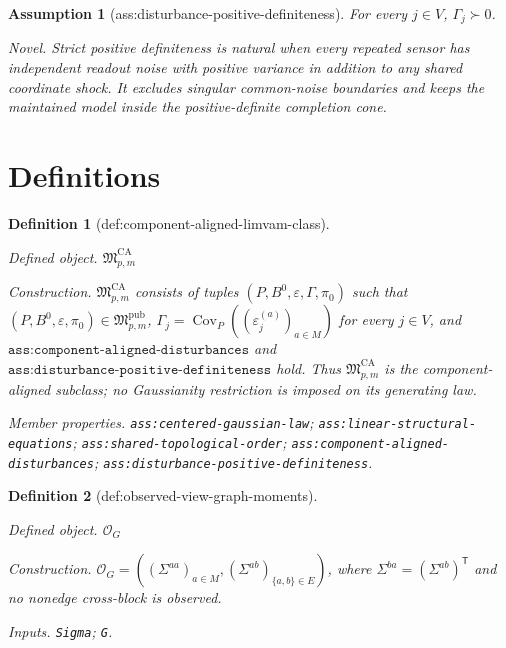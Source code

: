 \documentclass{article}
\newtheorem{assumption}{Assumption}
\newtheorem{definition}{Definition}
\begin{document}
\begin{assumption}[ass:disturbance-positive-definiteness]\label{ass:disturbance-positive-definiteness}
For every \(j\in V\), \(\Gamma_j\succ0\).
\par\smallskip\noindent\emph{Novel.} Strict positive definiteness is natural when every repeated sensor has independent readout noise with positive variance in addition to any shared coordinate shock. It excludes singular common-noise boundaries and keeps the maintained model inside the positive-definite completion cone.
\end{assumption}

\section{Definitions}

\begin{definition}[def:component-aligned-limvam-class]\label{def:component-aligned-limvam-class}
\par\smallskip\noindent\emph{Defined object.} \(\mathfrak M_{p,m}^{\mathrm{CA}}\)
\par\smallskip\noindent\emph{Construction.} \(\mathfrak M_{p,m}^{\mathrm{CA}}\) consists of tuples \((P,B^0,\varepsilon,\Gamma,\pi_0)\) such that \((P,B^0,\varepsilon,\pi_0)\in\mathfrak M_{p,m}^{\mathrm{pub}}\), \(\Gamma_j=\operatorname{Cov}_P((\varepsilon_j^{(a)})_{a\in M})\) for every \(j\in V\), and \(\texttt{ass:component-aligned-disturbances}\) and \(\texttt{ass:disturbance-positive-definiteness}\) hold. Thus \(\mathfrak M_{p,m}^{\mathrm{CA}}\) is the component-aligned subclass; no Gaussianity restriction is imposed on its generating law.
\par\smallskip\noindent\emph{Member properties.} \texttt{ass:\allowbreak{}centered-\allowbreak{}gaussian-\allowbreak{}law}; \texttt{ass:\allowbreak{}linear-\allowbreak{}structural-\allowbreak{}equations}; \texttt{ass:\allowbreak{}shared-\allowbreak{}topological-\allowbreak{}order}; \texttt{ass:\allowbreak{}component-\allowbreak{}aligned-\allowbreak{}disturbances}; \texttt{ass:\allowbreak{}disturbance-\allowbreak{}positive-\allowbreak{}definiteness}.
\end{definition}

\begin{definition}[def:observed-view-graph-moments]\label{def:observed-view-graph-moments}
\par\smallskip\noindent\emph{Defined object.} \(\mathcal O_G\)
\par\smallskip\noindent\emph{Construction.} \(\mathcal O_G=((\Sigma^{aa})_{a\in M},(\Sigma^{ab})_{\{a,b\}\in E})\), where \(\Sigma^{ba}=(\Sigma^{ab})^{\mathsf T}\) and no nonedge cross-block is observed.
\par\smallskip\noindent\emph{Inputs.} \texttt{Sigma}; \texttt{G}.
\end{definition}
\end{document}
